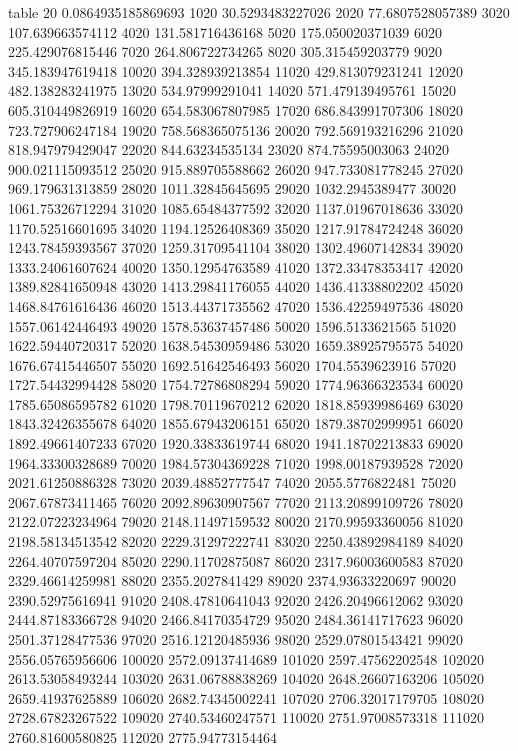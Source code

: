 table {%
20 0.0864935185869693
1020 30.5293483227026
2020 77.6807528057389
3020 107.639663574112
4020 131.581716436168
5020 175.050020371039
6020 225.429076815446
7020 264.806722734265
8020 305.315459203779
9020 345.183947619418
10020 394.328939213854
11020 429.813079231241
12020 482.138283241975
13020 534.97999291041
14020 571.479139495761
15020 605.310449826919
16020 654.583067807985
17020 686.843991707306
18020 723.727906247184
19020 758.568365075136
20020 792.569193216296
21020 818.947979429047
22020 844.63234535134
23020 874.75595003063
24020 900.021115093512
25020 915.889705588662
26020 947.733081778245
27020 969.179631313859
28020 1011.32845645695
29020 1032.2945389477
30020 1061.75326712294
31020 1085.65484377592
32020 1137.01967018636
33020 1170.52516601695
34020 1194.12526408369
35020 1217.91784724248
36020 1243.78459393567
37020 1259.31709541104
38020 1302.49607142834
39020 1333.24061607624
40020 1350.12954763589
41020 1372.33478353417
42020 1389.82841650948
43020 1413.29841176055
44020 1436.41338802202
45020 1468.84761616436
46020 1513.44371735562
47020 1536.42259497536
48020 1557.06142446493
49020 1578.53637457486
50020 1596.5133621565
51020 1622.59440720317
52020 1638.54530959486
53020 1659.38925795575
54020 1676.67415446507
55020 1692.51642546493
56020 1704.5539623916
57020 1727.54432994428
58020 1754.72786808294
59020 1774.96366323534
60020 1785.65086595782
61020 1798.70119670212
62020 1818.85939986469
63020 1843.32426355678
64020 1855.67943206151
65020 1879.38702999951
66020 1892.49661407233
67020 1920.33833619744
68020 1941.18702213833
69020 1964.33300328689
70020 1984.57304369228
71020 1998.00187939528
72020 2021.61250886328
73020 2039.48852777547
74020 2055.5776822481
75020 2067.67873411465
76020 2092.89630907567
77020 2113.20899109726
78020 2122.07223234964
79020 2148.11497159532
80020 2170.99593360056
81020 2198.58134513542
82020 2229.31297222741
83020 2250.43892984189
84020 2264.40707597204
85020 2290.11702875087
86020 2317.96003600583
87020 2329.46614259981
88020 2355.2027841429
89020 2374.93633220697
90020 2390.52975616941
91020 2408.47810641043
92020 2426.20496612062
93020 2444.87183366728
94020 2466.84170354729
95020 2484.36141717623
96020 2501.37128477536
97020 2516.12120485936
98020 2529.07801543421
99020 2556.05765956606
100020 2572.09137414689
101020 2597.47562202548
102020 2613.53058493244
103020 2631.06788838269
104020 2648.26607163206
105020 2659.41937625889
106020 2682.74345002241
107020 2706.32017179705
108020 2728.67823267522
109020 2740.53460247571
110020 2751.97008573318
111020 2760.81600580825
112020 2775.94773154464
}

